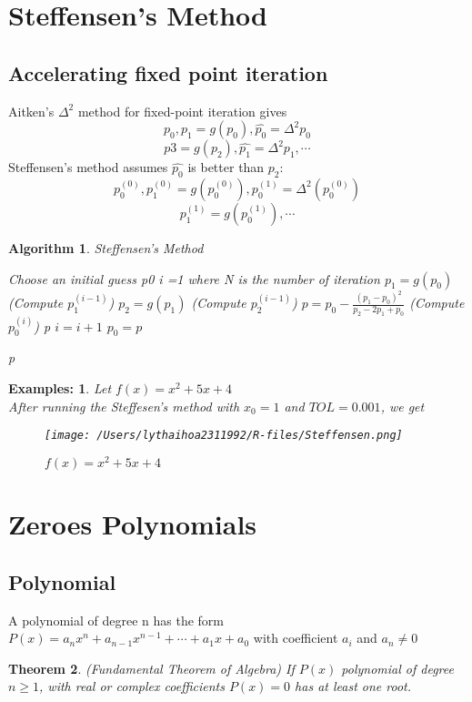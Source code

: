 \documentclass[12pt]{article}
\newtheorem{theorem}{Theorem}[subsection]
\newtheorem{alg}[theorem]{Algorithm}
\newtheorem*{ex}{Examples:}
\begin{document}
\section{Steffensen's Method}
\subsection{Accelerating fixed point iteration}
Aitken's $\Delta^2$ method for fixed-point iteration gives $$p_0, p_1 = g(p_0), \hat{p_0} = \Delta^2p_0$$ $$p3 = g(p_2), \hat{p_1} = \Delta^2p_1, \cdots$$
Steffensen's method assumes $\hat{p_0}$ is better than $p_2$: 
$$p_0^{(0)}, p_1^{(0)} = g(p_0^{(0)}), p_0^{(1)} = \Delta^2(p_0^{(0)})$$ $$p_1^{(1)} = g(p_0^{(1)}), \cdots$$
\begin{alg}{Steffensen's Method}
	\begin{algorithmic}
	Choose an initial guess p0
	\State i =1
	 where N is the number of iteration
		\State $p_1 = g(p_0)$ (Compute $p_1^{(i-1)}$)
		\State $p_2 = g(p_1)$ (Compute $p_2^{(i-1)}$)
		\State $p = p_0 - \frac{(p_1 - p_0)^2}{p_2 - 2p_1 + p_0}$ (Compute $p_0^{(i)}$)
			\State \Return p
		\EndIf
		\State $i = i+1$
		\State $p_0 = p$
		
	\EndWhile
	\State \Return p	
	\end{algorithmic}

\end{alg}
\begin{ex}
Let $f(x) = x^2 + 5x +4$ \\
After running the Steffesen's method with $x_0 = 1$ and $TOL = 0.001$, we get 	\\
\begin{figure}[H]
\centering 
\texttt{[image: /Users/lythaihoa2311992/R-files/Steffensen.png]}
\caption{$f(x) = x^2 +5x +4$}	
\end{figure}	
\end{ex}

\section{Zeroes Polynomials}

\subsection{Polynomial}
A polynomial of degree n has the form $P(x) = a_nx^n +a_{n-1}x^{n-1} + \cdots +a_1x + a_0$ with coefficient $a_i$ and $a_n \neq 0$
\begin{theorem}{(Fundamental Theorem of Algebra)}
\newline If $P(x)$ polynomial of degree $n \geq 1$, with real or complex coefficients $P(x) = 0$ has at least one root. 	
\end{theorem} 
\end{document}
